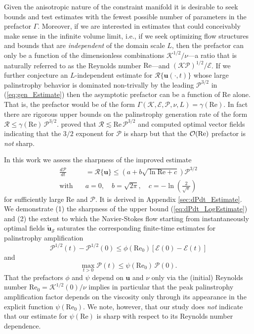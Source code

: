 \documentclass[11pt]{article}
\def\E{{\mathcal{E}}}
\def\P{{\mathcal{P}}}
\def\R{{\mathcal{R}}}
\def\K{{\mathcal{K}}}
\newcommand{\uvec}{\mathbf{u}}
\newcommand{\tuvec}{\widetilde{\mathbf{u}}}
\newcommand{\Reyn}{\textrm{Re}}
\begin{document}
Given the anisotropic nature of the constraint manifold it is desirable to seek bounds and test estimates with the fewest possible number of parameters in the prefactor $\Gamma$.
Moreover, if we are interested in estimates that could conceivably make sense in the infinite volume limit, i.e., if we seek optimizing flow structures and bounds that are {\it independent} of the domain scale $L$, then the prefactor can only be a function of the dimensionless combinations $\K^{1/2}/\nu$---a ratio that is naturally referred to as the Reynolds number $\Reyn$---and $(\K \P)^{1/2} / \E$.
If we further conjecture an $L$-independent estimate for $\R\{\uvec(\cdot,t)\}$ whose large palinstrophy behavior is dominated non-trivally by the leading $\P^{3/2}$ in (\ref{eq:gen_Estimate}) then the asymptotic prefactor can be a function of  $\Reyn$ alone.
That is, the prefactor would be of the form $\Gamma(\K,\E,\P,\nu,L) = \gamma(\Reyn)$.
In fact there are rigorous upper bounds on the palinstrophy generation rate of the form $ \R \le \gamma(\Reyn) \, \P^{3/2}$.
\cite{ap13a} proved that $\R \lesssim \Reyn \, \P^{3/2}$ and computed optimal vector fields indicating that the $3/2$ exponent for $\P$ is sharp but that the ${\cal O}(\Reyn)$ prefactor is {\it not} sharp.

In this work we assess the sharpness of the improved estimate
\begin{equation}\label{eq:dPdt_LogEstimate}
\begin{aligned}
\frac{d\P}{dt} & = \R\{\uvec\} \le \left(a + b\sqrt{\ln\Reyn+c}  \right) \P^{3/2} \\ 
\text{with} \quad & a = 0, \quad  b = \sqrt{2\pi}, \quad c = -\ln\left( \frac{2}{\sqrt{\pi}} \right)
\end{aligned}
\end{equation} 
for sufficiently large $\Reyn$ and $\P$.
It is derived in Appendix \ref{sec:dPdt_Estimate}.
We demonstrate (1) the sharpness of the upper bound (\ref{eq:dPdt_LogEstimate}) and (2) the extent to which the Navier-Stokes flow starting from instantaneously optimal fields $\tuvec_{\mathcal{S}}$ saturates the corresponding finite-time estimates for palinstrophy amplification
\begin{equation}
\P^{1/2}(t) - \P^{1/2}(0) \leq \phi(\Reyn_0)  \left[\E(0) - \E(t)\right]
\end{equation} 
and
\begin{equation}
\mathop{\max}_{t > 0} \P(t) \le \psi(\Reyn_0) \, \P(0).
\end{equation} 
That the prefactors $\phi$ and $\psi$ depend on $\uvec$ and $\nu$ only via the (initial) Reynolds number $\Reyn_0 = \K^{1/2}(0)/\nu$ implies in particular that the peak palinstrophy amplification factor depends on the viscosity only through its appearance in the explicit function $\psi(\Reyn_0)$.
We note, however, that our study does {\it not} indicate that our estimate for $\psi(\Reyn)$ is sharp with respect to its Reynolds number dependence.
\end{document}
